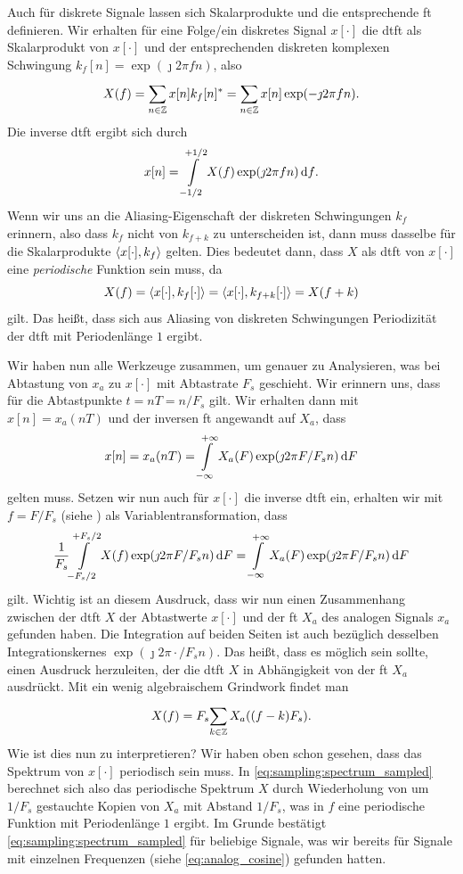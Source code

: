 Auch für diskrete Signale lassen sich Skalarprodukte und die entsprechende \gls{ft} definieren.
Wir erhalten für eine Folge/ein diskretes Signal $x[\cdot]$ die \gls{dtft} als Skalarprodukt von $x[\cdot]$ und der entsprechenden diskreten komplexen Schwingung $k_f[n] = \exp(\jmath 2 \pi f n)$, also
%
\begin{equation}\label{eq:dtft_inner_prod}
    X(f) = {\sum\limits_{n \in \mathbb{Z}}^{}{
            x[n] k_f[n]^\ast
        }}
        = {\sum\limits_{n \in \mathbb{Z}}^{}{
            x[n] \exp(-\jmath 2 \pi f n)
        }}.
\end{equation}
%
Die inverse \gls{dtft} ergibt sich durch
\[
x[n] = {\int\limits_{-1/2}^{+1/2}{X(f) \exp(\jmath 2 \pi f n)}\,\mathrm{d}{f}}.
\]
Wenn wir uns an die Aliasing-Eigenschaft der diskreten Schwingungen $k_f$ erinnern, also dass $k_f$ nicht von $k_{f+k}$ zu unterscheiden ist, dann muss dasselbe für die Skalarprodukte ${\left\langle x[\cdot],k_f \right\rangle}$ gelten.
Dies bedeutet dann, dass $X$ als \gls{dtft} von $x[\cdot]$ eine \emph{periodische} Funktion sein muss, da
\[
X(f) = {\left\langle x[\cdot],k_f[\cdot] \right\rangle} = {\left\langle x[\cdot],k_{f+k}[\cdot] \right\rangle} = X(f+k)
\]
gilt.
Das heißt, dass sich aus Aliasing von diskreten Schwingungen Periodizität der \gls{dtft} mit Periodenlänge $1$ ergibt.

Wir haben nun alle Werkzeuge zusammen, um genauer zu Analysieren, was bei Abtastung von $x_a$ zu $x[\cdot]$ mit Abtastrate $F_s$ geschieht.
Wir erinnern uns, dass für die Abtastpunkte $t = nT = n/F_s$ gilt.
Wir erhalten dann mit $x[n] = x_a(nT)$ und der inversen \gls{ft} angewandt auf $X_a$, dass
\[
x[n] = x_a(nT) = {\int\limits_{-\infty}^{+\infty}{X_a(F) \exp(\jmath 2 \pi F/F_s n)}\,\mathrm{d}{F}}
\]
gelten muss.
Setzen wir nun auch für $x[\cdot]$ die inverse \gls{dtft} ein, erhalten wir mit $f = F/F_s$ (siehe ) als Variablentransformation, dass
\[
    \frac{1}{F_s} {\int\limits_{-{F_s}/2}^{+{F_s}/2}{X(f) \exp(\jmath 2 \pi F/F_s n)}\,\mathrm{d}{F}}
    = {\int\limits_{-\infty}^{+\infty}{X_a(F) \exp(\jmath 2 \pi F/F_s n)}\,\mathrm{d}{F}}
\]
gilt. 
Wichtig ist an diesem Ausdruck, dass wir nun einen Zusammenhang zwischen der \gls{dtft} $X$ der Abtastwerte $x[\cdot]$ und der \gls{ft} $X_a$ des analogen Signals $x_a$ gefunden haben.
Die Integration auf beiden Seiten ist auch bezüglich desselben Integrationskernes $\exp(\jmath 2 \pi \cdot/F_s n)$.
Das heißt, dass es möglich sein sollte, einen Ausdruck herzuleiten, der die \gls{dtft} $X$ in Abhängigkeit von der \gls{ft} $X_a$ ausdrückt.
Mit ein wenig algebraischem Grindwork findet man
%
\begin{equation}\label{eq:sampling:spectrum_sampled}
    X(f) = F_s {\sum\limits_{k \in \mathbb{Z}}^{}{X_a((f - k) F_s)}}.
\end{equation}
%
Wie ist dies nun zu interpretieren? 
Wir haben oben schon gesehen, dass das Spektrum von $x[\cdot]$ periodisch sein muss.
In \eqref{eq:sampling:spectrum_sampled} berechnet sich also das periodische Spektrum $X$ durch Wiederholung von um $1/F_s$ gestauchte Kopien von $X_a$ mit Abstand $1/F_s$, was in $f$ eine periodische Funktion mit Periodenlänge $1$ ergibt.
Im Grunde bestätigt \eqref{eq:sampling:spectrum_sampled} für beliebige Signale, was wir bereits für Signale mit einzelnen Frequenzen (siehe \eqref{eq:analog_cosine}) gefunden hatten.

